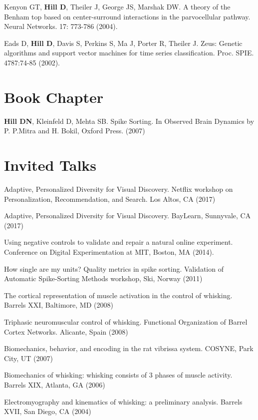 \documentclass[line,11pt]{res}
\begin{document}
\begin{resume}
Kenyon GT, \textbf{Hill D}, Theiler J, George JS, Marshak DW. A theory of the Benham top based on center-surround interactions in the parvocellular pathway. Neural Networks. 17: 773-786 (2004). 

Eads D, \textbf{Hill D}, Davis S, Perkins S, Ma J, Porter R, Theiler J. Zeus: Genetic algorithms and support vector machines for time series classification. Proc. SPIE. 4787:74-85 (2002).

\section{Book Chapter}
\vspace{0.1in}

\textbf{Hill DN}, Kleinfeld D, Mehta SB. Spike Sorting. In Observed Brain Dynamics by P. P.Mitra and H. Bokil, Oxford Press. (2007)

\section{Invited Talks}
\vspace{0.1in}

Adaptive, Personalized Diversity for Visual Discovery. Netflix workshop on Personalization, Recommendation, and Search. Los Altos, CA (2017)

Adaptive, Personalized Diversity for Visual Discovery. BayLearn, Sunnyvale, CA (2017)

Using negative controls to validate and repair a natural online experiment.  Conference on Digital Experimentation at MIT, Boston, MA (2014).

How single are my units? Quality metrics in spike sorting. Validation of Automatic Spike-Sorting Methods workshop, Ski, Norway (2011)

The cortical representation of muscle activation in the control of whisking. Barrels XXI, Baltimore, MD (2008)

Triphasic neuromuscular control of whisking. Functional Organization of Barrel Cortex Networks. Alicante, Spain (2008)

Biomechanics, behavior, and encoding in the rat vibrissa system. COSYNE, Park City, UT (2007)

Biomechanics of whisking: whisking consists of 3 phases of muscle activity. Barrels XIX, Atlanta, GA (2006)

Electromyography and kinematics of whisking: a preliminary analysis. Barrels XVII, San Diego, CA (2004)

\end{resume}
\end{document}
